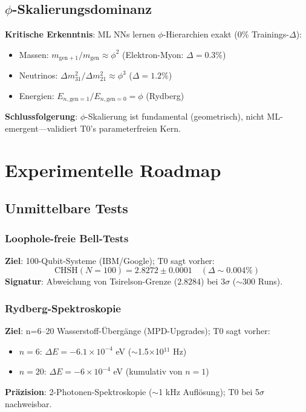 	\subsection{$\phi$-Skalierungsdominanz}
	
	\textbf{Kritische Erkenntnis}: ML NNs lernen $\phi$-Hierarchien exakt (0\% Trainings-$\Delta$):
	\begin{itemize}
		\item Massen: $m_{\text{gen}+1} / m_{\text{gen}} \approx \phi^2$ (Elektron-Myon: $\Delta=0.3\%$)
		\item Neutrinos: $\Delta m_{31}^2 / \Delta m_{21}^2 \approx \phi^3$ ($\Delta=1.2\%$)
		\item Energien: $E_{n,\text{gen}=1} / E_{n,\text{gen}=0} = \phi$ (Rydberg)
	\end{itemize}
	\textbf{Schlussfolgerung}: $\phi$-Skalierung ist fundamental (geometrisch), nicht ML-emergent—validiert T0's parameterfreien Kern.
	
	\section{Experimentelle Roadmap}
	
	\subsection{Unmittelbare Tests}
	
	\subsubsection{Loophole-freie Bell-Tests}
	
	\textbf{Ziel}: 100-Qubit-Systeme (IBM/Google); T0 sagt vorher:
	\begin{equation}
		\text{CHSH}(N=100) = 2.8272 \pm 0.0001 \quad (\Delta \sim 0.004\%) \tag{ML-Gl.~6.1}
	\end{equation}
	\textbf{Signatur}: Abweichung von Tsirelson-Grenze ($2.8284$) bei $3\sigma$ ($\sim300$ Runs).
	
	\subsubsection{Rydberg-Spektroskopie}
	
	\textbf{Ziel}: n=6--20 Wasserstoff-Übergänge (MPD-Upgrades); T0 sagt vorher:
	\begin{itemize}
		\item $n=6$: $\Delta E = -6.1\times10^{-4}$ eV ($\sim$1.5$\times$10$^{11}$ Hz)
		\item $n=20$: $\Delta E = -6\times10^{-4}$ eV (kumulativ von $n=1$)
	\end{itemize}
	\textbf{Präzision}: 2-Photonen-Spektroskopie ($\sim$1 kHz Auflösung); T0 bei 5$\sigma$ nachweisbar.
	
